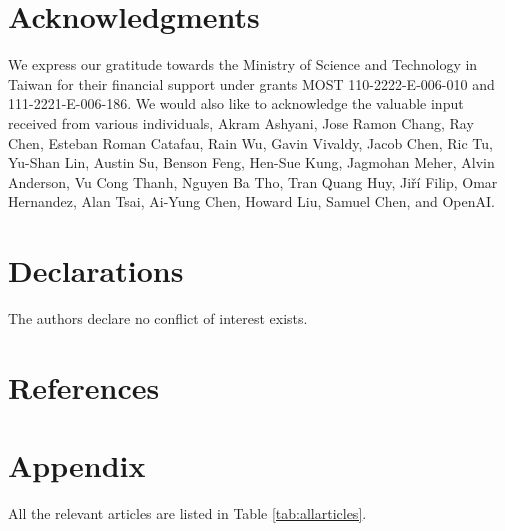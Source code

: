 \documentclass[12pt, a4paper, twocolumn]{article}
\begin{document}
	\section{Acknowledgments}
	We express our gratitude towards the Ministry of Science and Technology in Taiwan for their financial support under grants MOST 110-2222-E-006-010 and 111-2221-E-006-186. We would also like to acknowledge the valuable input received from various individuals, Akram Ashyani, Jose Ramon Chang, Ray Chen, Esteban Roman Catafau, Rain Wu, Gavin Vivaldy, Jacob Chen, Ric Tu, Yu-Shan Lin, Austin Su, Benson Feng, Hen-Sue Kung, Jagmohan Meher, Alvin Anderson, Vu Cong Thanh, Nguyen Ba Tho, Tran Quang Huy, Jiří Filip, Omar Hernandez, Alan Tsai, Ai-Yung Chen, Howard Liu, Samuel Chen, and OpenAI.

	\section{Declarations}
	The authors declare no conflict of interest exists.

	\clearpage

	\section{References} \label{sec:references}
		\footnotesize

	
	\onecolumn	
	\section{Appendix}\label{sec:Appendix}
	
	All the relevant articles are listed in Table \ref{tab:allarticles}.
\end{document}
